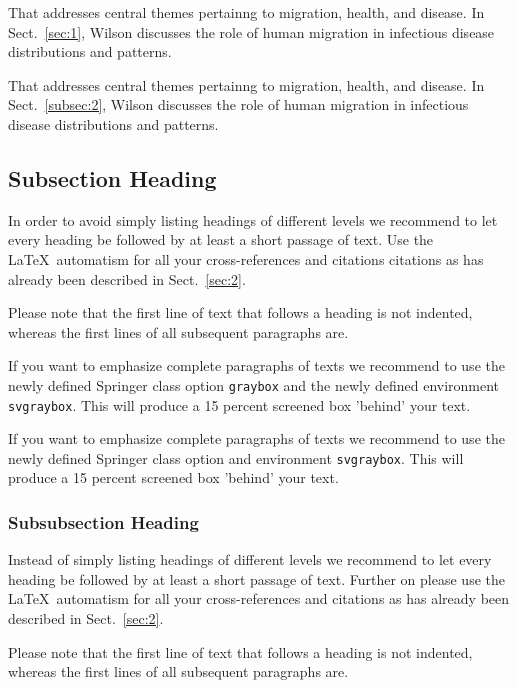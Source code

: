 \documentclass[graybox]{svmult}
\begin{document}
\begin{description}[Type 1]
\item[Type 1]{That addresses central themes pertainng to migration, health, and disease. In Sect.~\ref{sec:1}, Wilson discusses the role of human migration in infectious disease distributions and patterns.}
\item[Type 2]{That addresses central themes pertainng to migration, health, and disease. In Sect.~\ref{subsec:2}, Wilson discusses the role of human migration in infectious disease distributions and patterns.}
\end{description}

\subsection{Subsection Heading} %
In order to avoid simply listing headings of different levels we recommend to let every heading be followed by at least a short passage of text. Use the \LaTeX\ automatism for all your cross-references and citations citations as has already been described in Sect.~\ref{sec:2}.

Please note that the first line of text that follows a heading is not indented, whereas the first lines of all subsequent paragraphs are.

\begin{svgraybox}
If you want to emphasize complete paragraphs of texts we recommend to use the newly defined Springer class option \verb|graybox| and the newly defined environment \verb|svgraybox|. This will produce a 15 percent screened box 'behind' your text.

If you want to emphasize complete paragraphs of texts we recommend to use the newly defined Springer class option and environment \verb|svgraybox|. This will produce a 15 percent screened box 'behind' your text.
\end{svgraybox}


\subsubsection{Subsubsection Heading}
Instead of simply listing headings of different levels we recommend to
let every heading be followed by at least a short passage of text.
Further on please use the \LaTeX\ automatism for all your
cross-references and citations as has already been described in
Sect.~\ref{sec:2}.

Please note that the first line of text that follows a heading is not indented, whereas the first lines of all subsequent paragraphs are.
\end{document}
